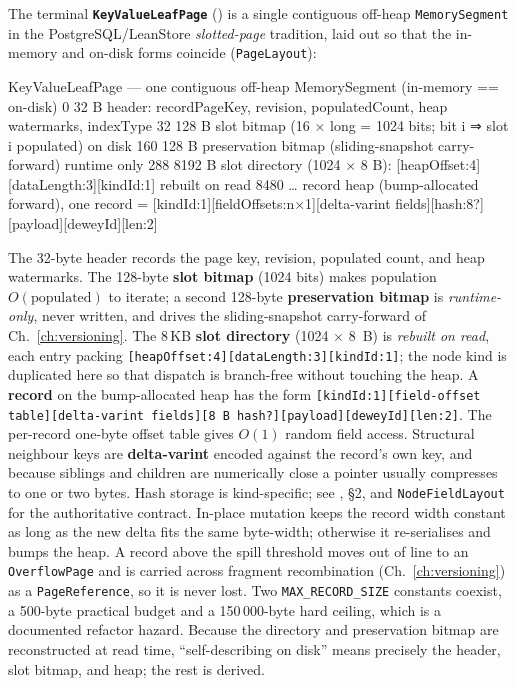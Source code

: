 \documentclass[11pt,a4paper,oneside]{report}
\newcommand{\dcap}[1]{\par\vspace{1pt}\noindent{\small\sffamily\bfseries\color{slate}#1}\par\vspace{-2pt}}
\theoremstyle{sirixthm}
\newcommand{\code}[1]{\texttt{#1}}
\begin{document}
The terminal \textbf{\code{KeyValueLeafPage}} () is a single
contiguous off-heap \code{MemorySegment} in the PostgreSQL/LeanStore \emph{slotted-page} tradition,
laid out so that the in-memory and on-disk forms coincide (\code{PageLayout}):

\dcap{\code{KeyValueLeafPage} --- the slotted-page memory map}
\begin{diagramS}
KeyValueLeafPage — one contiguous off-heap MemorySegment   (in-memory == on-disk)
  0      32 B   header: recordPageKey, revision, populatedCount, heap watermarks, indexType
  32    128 B   slot bitmap (16 × long = 1024 bits; bit i ⇒ slot i populated)        on disk
  160   128 B   preservation bitmap (sliding-snapshot carry-forward)                 runtime only
  288  8192 B   slot directory (1024 × 8 B): [heapOffset:4][dataLength:3][kindId:1]   rebuilt on read
  8480   …      record heap (bump-allocated forward), one record =
                  [kindId:1][fieldOffsets:n×1][delta-varint fields][hash:8?][payload][deweyId][len:2]
\end{diagramS}

The 32-byte header records the page key, revision, populated count, and heap watermarks. The
128-byte \textbf{slot bitmap} (1024 bits) makes population $O(\text{populated})$ to iterate; a second
128-byte \textbf{preservation bitmap} is \emph{runtime-only}, never written, and drives the
sliding-snapshot carry-forward of Ch.~\ref{ch:versioning}. The 8\,KB \textbf{slot directory}
(1024 $\times$ 8~B) is \emph{rebuilt on read}, each entry packing
\code{[heapOffset:4][dataLength:3][kindId:1]}; the node kind is duplicated here so that dispatch is
branch-free without touching the heap. A \textbf{record} on the bump-allocated heap has the form
\code{[kindId:1][field-offset table][delta-varint fields][8\,B hash?][payload][deweyId][len:2]}. The
per-record one-byte offset table gives $O(1)$ random field access. Structural neighbour keys are
\textbf{delta-varint} encoded against the record's own key, and because siblings and children are
numerically close a pointer usually compresses to one or two bytes. Hash storage is kind-specific;
see , \S2, and \code{NodeFieldLayout} for the authoritative contract.
In-place mutation keeps the record width constant as long as the new delta
fits the same byte-width; otherwise it re-serialises and bumps the heap. A record above the spill
threshold moves out of line to an \code{OverflowPage} and is carried across fragment recombination
(Ch.~\ref{ch:versioning}) as a \code{PageReference}, so it is never lost. Two \code{MAX\_RECORD\_SIZE}
constants coexist, a 500-byte practical budget and a 150\,000-byte hard ceiling, which is a documented
refactor hazard. Because the directory and preservation bitmap are reconstructed at read time,
``self-describing on disk'' means precisely the header, slot bitmap, and heap; the rest is derived.
\end{document}
